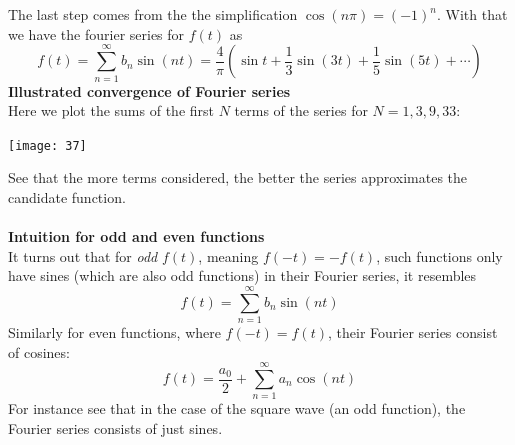 \documentclass{report}
\begin{document}
The last step comes from the the simplification $\cos(n\pi)=(-1)^n$.
With that we have the fourier series for $f(t)$ as
\begin{equation*}
f(t)=\sum^\infty_{n=1}b_n\sin(nt)=\frac{4}{\pi}\left(
\sin t+\frac{1}{3}\sin(3t)+\frac{1}{5}\sin(5t)+\cdots\right)
\end{equation*}
\textbf{Illustrated convergence of Fourier series}\\
Here we plot the sums of the first $N$ terms of the series for $N=1,3,9,33$:
\begin{center}
\texttt{[image: 37]}\\
\end{center}
See that the more terms considered, the better the series approximates the candidate function.\\
\vspace{1mm}\\
\textbf{Intuition for odd and even functions}\\
It turns out that for \textit{odd} $f(t)$, meaning $f(-t)=-f(t)$, such functions only have sines (which
are also odd functions) in their Fourier series, it resembles
\begin{equation*}
f(t)=\sum^\infty_{n=1}b_n\sin(nt)
\end{equation*}
Similarly for even functions, where $f(-t)=f(t)$, their Fourier series consist of cosines:
\begin{equation*}
f(t)=\frac{a_0}{2}+\sum^\infty_{n=1}a_n\cos(nt)
\end{equation*}
For instance see that in the case of the square wave (an odd function), the Fourier series consists of just sines.
\newpage
\end{document}
